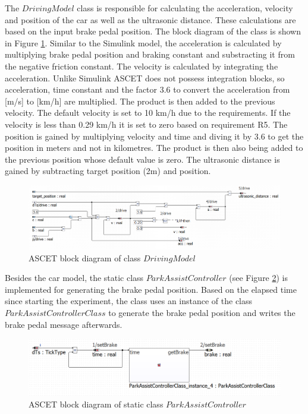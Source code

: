 The $DrivingModel$ class is responsible for calculating the acceleration, velocity and position of the car as well as the ultrasonic distance. These calculations are based on the input brake pedal position. The block diagram of the class is shown in Figure \ref{fig:BlockdiagrammDrivingModel}. Similar to the Simulink model, the acceleration is calculated by multiplying brake pedal position and braking constant and substracting it from the negative friction constant. The velocity is calculated by integrating the acceleration. Unlike Simulink ASCET does not possess integration blocks, so acceleration, time constant and the factor 3.6 to convert the acceleration from [m/s] to [km/h] are multiplied. The product is then added to the previous velocity. The default velocity is set to 10 km/h due to the requirements. If the velocity is less than 0.29 km/h it is set to zero based on requirement R5. The position is gained by multiplying velocity and time and diving it by 3.6 to get the position in meters and not in kilometres. The product is then also being added to the previous position whose default value is zero. The ultrasonic distance is gained by subtracting target position (2m) and position.

\begin{figure}[H]
\centering
\includegraphics[width=1\textwidth]{images/Blockdiagramm_drivingmodel.png}
\caption{ASCET block diagram of class $DrivingModel$}
\label{fig:BlockdiagrammDrivingModel}
\end{figure}

Besides the car model, the static class $ParkAssistController$ (see Figure \ref{fig:BlockdiagrammParkAssistController}) is implemented for generating the brake pedal position. Based on the elapsed time since starting the experiment, the class uses an instance of the class $ParkAssistControllerClass$ to generate the brake pedal position and writes the brake pedal message afterwards. 

\begin{figure}[H]
\centering
\includegraphics[width=1\textwidth]{images/Blockdiagramm_ParkAssistController.png}
\caption{ASCET block diagram of static class $ParkAssistController$}
\label{fig:BlockdiagrammParkAssistController}
\end{figure}

